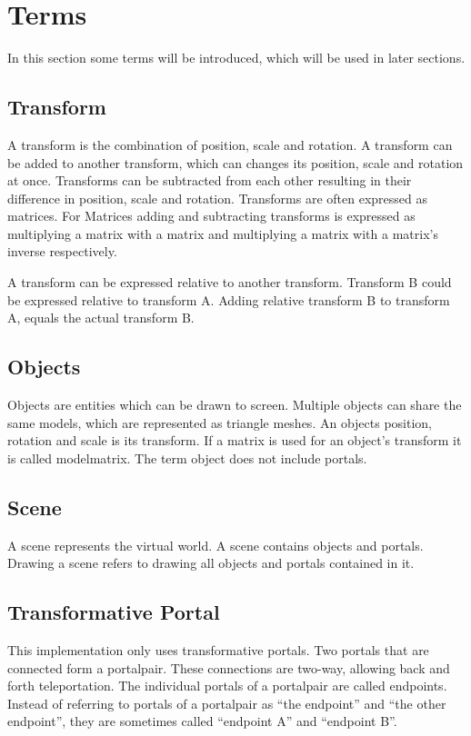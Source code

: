 \section{Terms}
In this section some terms will be introduced, which will be used in later sections.

\subsection{Transform}
A transform is the combination of position, scale and rotation. A transform can be added to another transform, which can changes its position, scale and rotation at once. Transforms can be subtracted from each other resulting in their difference in position, scale and rotation. Transforms are often expressed as matrices. For Matrices adding and subtracting transforms is expressed as multiplying a matrix with a matrix and multiplying a matrix with a matrix's inverse respectively.

A transform can be expressed relative to another transform. Transform B could be expressed relative to transform A. Adding relative transform B to transform A, equals the actual transform B.


\subsection{Objects}
Objects are entities which can be drawn to screen. Multiple objects can share the same models, which are represented as triangle meshes. An objects position, rotation and scale is its transform. If a matrix is used for an object's transform it is called \gls{modelmatrix}. The term object does not include portals.

\subsection{Scene}
A scene represents the virtual world. A scene contains objects and portals. Drawing a scene refers to drawing all objects and portals contained in it.



\subsection{Transformative Portal}
This implementation only uses transformative portals. Two portals  that are connected form a \gls{portalpair}. These connections are two-way, allowing back and forth teleportation. The individual portals of a \gls{portalpair} are called \glspl{endpoint}. Instead of referring to portals of a \gls{portalpair} as \enquote{the \gls{endpoint}} and \enquote{the other \gls{endpoint}}, they are sometimes called \enquote{\gls{endpoint} A} and \enquote{\gls{endpoint} B}.

